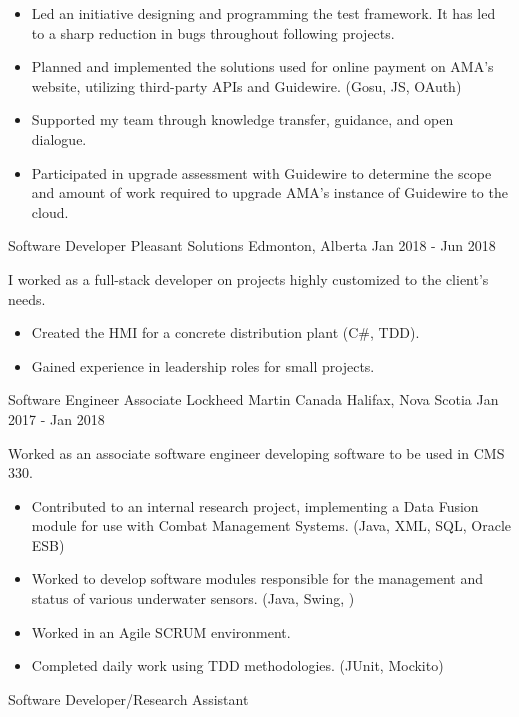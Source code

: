 \begin{cventries}
{            \begin{itemize}
                \item Led an initiative designing and programming the test framework.  It has led to a sharp reduction in bugs throughout following projects.
                \item Planned and implemented the solutions used for online payment on AMA’s website, utilizing third-party APIs and Guidewire. (Gosu, JS, OAuth)
                \item Supported my team through knowledge transfer, guidance, and open dialogue.
                \item Participated in upgrade assessment with Guidewire to determine the scope and amount of work required to upgrade AMA's instance of Guidewire to the cloud.
            \end{itemize}
        }
    \cventry
        {Software Developer}
        {Pleasant Solutions}
        {Edmonton, Alberta}
        {Jan 2018 - Jun 2018}
        {
            I worked as a full-stack developer on projects highly customized to the client’s needs.
            \begin{itemize}
                \item Created the HMI for a concrete distribution plant (C\#, TDD).
                \item Gained experience in leadership roles for small projects.
            \end{itemize}
        }
    \cventry
        {Software Engineer Associate}
        {Lockheed Martin Canada}
        {Halifax, Nova Scotia}
        {Jan 2017 - Jan 2018}
        {
            Worked as an associate software engineer developing software to be used in CMS 330.
            \begin{itemize}
                \item Contributed to an internal research project, implementing a Data Fusion module for use with Combat Management Systems. (Java, XML, SQL, Oracle ESB)
                \item Worked to develop software modules responsible for the management and status of various underwater sensors. (Java, Swing, )
                \item Worked in an Agile SCRUM environment.
                \item Completed daily work using TDD methodologies. (JUnit, Mockito)
            \end{itemize}
        }
    \cventry
        {Software Developer/Research Assistant}

\end{cventries}
